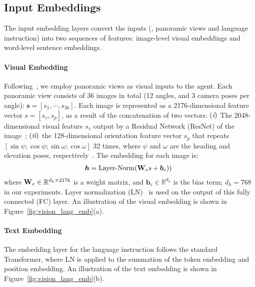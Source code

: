 \documentclass[10pt,twocolumn,letterpaper]{article}
\newcommand{\RN}[1]{\textup{\lowercase\expandafter{\it \romannumeral#1}}}
\newcommand{\Wmat}[0]{{{\bf W}}}
\newcommand{\bv}[0]{{\boldsymbol{b}}}
\newcommand{\hv}[0]{{\boldsymbol{h}}}
\newcommand{\sv}{{\boldsymbol{s}}}
\newcommand{\R}{\mathbb{R}}
\begin{document}
\subsection{Input Embeddings}
The input embedding layers convert the inputs (\ie, panoramic views and language instruction) into two sequences of features:  image-level visual embeddings and word-level sentence embeddings.

\paragraph{Visual Embedding} Following~\cite{fried2018speaker}, we employ panoramic views as visual inputs to the agent. Each panoramic view consists of 36 images in total (12 angles, and 3 camera poses per angle): $\sv = [s_1, \cdots, s_{36}]$. Each image is represented as a 2176-dimensional feature vector $s = [s_{v},  s_{p}]$, as a result of the concatenation of two vectors: 
$(\RN{1})$ The 2048-dimensional visual feature $s_{v}$ output by a Residual Network (ResNet) of the image~\cite{he2016deep}; 
$(\RN{2})$ the 128-dimensional orientation feature vector $s_{p}$ that repeats $[\sin \psi ; \cos \psi ; \sin \omega; \cos \omega ]$ 32 times, where $\psi$ and $\omega$ are the heading and elevation poses, respectively~\cite{fried2018speaker}. The embedding for each image is:  
\begin{align} 
\hspace{-0mm}
\hv = \text{Layer-Norm}(  \Wmat_e s + \bv_e) ) 
\label{eq_visual_emb}
\end{align}
where $ \Wmat_e \in \R^{d_h \times 2176}$ is a weight matrix, and $\bv_e \in \R^{d_h}$ is the bias term; $d_h=768$ in our experiments. Layer normalization (LN)~\cite{ba2016layer} is used on the output of this fully connected (FC) layer. An illustration of the visual embedding is shown in Figure~\ref{fig:vision_lang_emb}(a).

\paragraph{Text Embedding} The embedding layer for the language instruction follows the standard Transformer, where LN is applied to the summation of the token embedding and position embedding.  An illustration of the text embedding is shown in Figure~\ref{fig:vision_lang_emb}(b).
\end{document}
